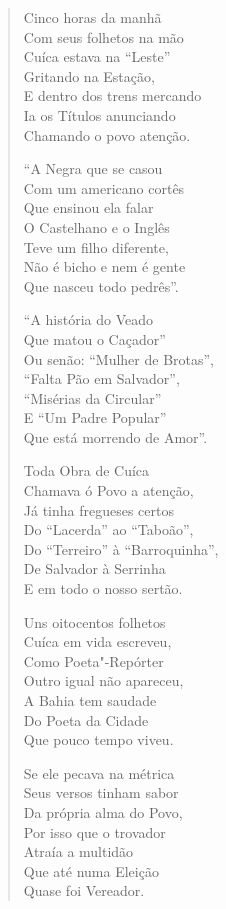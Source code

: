 \begin{verse}
Cinco horas da manhã \\
Com seus folhetos na mão \\
Cuíca estava na ``Leste'' \\
Gritando na Estação, \\
E dentro dos trens mercando \\
Ia os Títulos anunciando \\
Chamando o povo atenção. 

``A Negra que se casou \\
Com um americano cortês \\
Que ensinou ela falar \\
O Castelhano e o Inglês \\
Teve um filho diferente, \\
Não é bicho e nem é gente \\
Que nasceu todo pedrês''. 

``A história do Veado \\
Que matou o Caçador'' \\
Ou senão: ``Mulher de Brotas'', \\
``Falta Pão em Salvador'', \\
``Misérias da Circular'' \\
E ``Um Padre Popular'' \\
Que está morrendo de Amor''. 
\pagebreak

Toda Obra de Cuíca \\
Chamava ó Povo a atenção, \\
Já tinha fregueses certos \\
Do ``Lacerda'' ao ``Taboão'', \\
Do ``Terreiro'' à ``Barroquinha'', \\
De Salvador à Serrinha \\
E em todo o nosso sertão. 

Uns oitocentos folhetos \\
Cuíca em vida escreveu, \\
Como Poeta"-Repórter \\
Outro igual não apareceu, \\
A Bahia tem saudade \\
Do Poeta da Cidade \\
Que pouco tempo viveu. 

Se ele pecava na métrica \\
Seus versos tinham sabor \\
Da própria alma do Povo, \\
Por isso que o trovador \\
Atraía a multidão \\
Que até numa Eleição \\
Quase foi Vereador. 


\end{verse}

